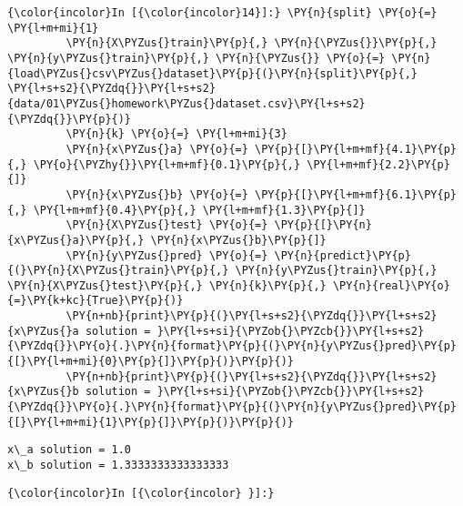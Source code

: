     \begin{Verbatim}[commandchars=\\\{\}]
{\color{incolor}In [{\color{incolor}14}]:} \PY{n}{split} \PY{o}{=} \PY{l+m+mi}{1}
         \PY{n}{X\PYZus{}train}\PY{p}{,} \PY{n}{\PYZus{}}\PY{p}{,} \PY{n}{y\PYZus{}train}\PY{p}{,} \PY{n}{\PYZus{}} \PY{o}{=} \PY{n}{load\PYZus{}csv\PYZus{}dataset}\PY{p}{(}\PY{n}{split}\PY{p}{,} \PY{l+s+s2}{\PYZdq{}}\PY{l+s+s2}{data/01\PYZus{}homework\PYZus{}dataset.csv}\PY{l+s+s2}{\PYZdq{}}\PY{p}{)}
         \PY{n}{k} \PY{o}{=} \PY{l+m+mi}{3}
         \PY{n}{x\PYZus{}a} \PY{o}{=} \PY{p}{[}\PY{l+m+mf}{4.1}\PY{p}{,} \PY{o}{\PYZhy{}}\PY{l+m+mf}{0.1}\PY{p}{,} \PY{l+m+mf}{2.2}\PY{p}{]}
         \PY{n}{x\PYZus{}b} \PY{o}{=} \PY{p}{[}\PY{l+m+mf}{6.1}\PY{p}{,} \PY{l+m+mf}{0.4}\PY{p}{,} \PY{l+m+mf}{1.3}\PY{p}{]}
         \PY{n}{X\PYZus{}test} \PY{o}{=} \PY{p}{[}\PY{n}{x\PYZus{}a}\PY{p}{,} \PY{n}{x\PYZus{}b}\PY{p}{]}
         \PY{n}{y\PYZus{}pred} \PY{o}{=} \PY{n}{predict}\PY{p}{(}\PY{n}{X\PYZus{}train}\PY{p}{,} \PY{n}{y\PYZus{}train}\PY{p}{,} \PY{n}{X\PYZus{}test}\PY{p}{,} \PY{n}{k}\PY{p}{,} \PY{n}{real}\PY{o}{=}\PY{k+kc}{True}\PY{p}{)}
         \PY{n+nb}{print}\PY{p}{(}\PY{l+s+s2}{\PYZdq{}}\PY{l+s+s2}{x\PYZus{}a solution = }\PY{l+s+si}{\PYZob{}\PYZcb{}}\PY{l+s+s2}{\PYZdq{}}\PY{o}{.}\PY{n}{format}\PY{p}{(}\PY{n}{y\PYZus{}pred}\PY{p}{[}\PY{l+m+mi}{0}\PY{p}{]}\PY{p}{)}\PY{p}{)}
         \PY{n+nb}{print}\PY{p}{(}\PY{l+s+s2}{\PYZdq{}}\PY{l+s+s2}{x\PYZus{}b solution = }\PY{l+s+si}{\PYZob{}\PYZcb{}}\PY{l+s+s2}{\PYZdq{}}\PY{o}{.}\PY{n}{format}\PY{p}{(}\PY{n}{y\PYZus{}pred}\PY{p}{[}\PY{l+m+mi}{1}\PY{p}{]}\PY{p}{)}\PY{p}{)}
\end{Verbatim}

    \begin{Verbatim}[commandchars=\\\{\}]
x\_a solution = 1.0
x\_b solution = 1.3333333333333333

    \end{Verbatim}

    \begin{Verbatim}[commandchars=\\\{\}]
{\color{incolor}In [{\color{incolor} }]:} 
\end{Verbatim}

